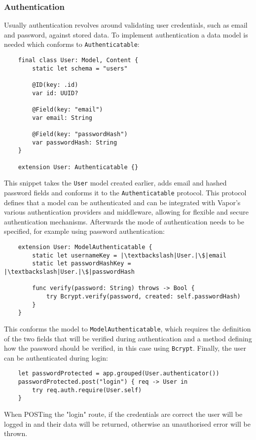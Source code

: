 \subsubsection{Authentication}
Usually authentication revolves around validating user credentials, such as email and password, against stored data. To implement authentication a data model is needed which conforms to \lstinline{Authenticatable}:
\begin{verbatim}
    final class User: Model, Content {
        static let schema = "users"
    
        @ID(key: .id)
        var id: UUID?
    
        @Field(key: "email")
        var email: String
    
        @Field(key: "passwordHash")
        var passwordHash: String
    }
    
    extension User: Authenticatable {}
\end{verbatim}
This snippet takes the \lstinline{User} model created earlier, adds email and hashed password fields and conforms it to the \lstinline{Authenticatable} protocol. This protocol defines that a model can be authenticated and can be integrated with Vapor's various authentication providers and middleware, allowing for flexible and secure authentication mechanisms.
Afterwards the mode of authentication needs to be specified, for example using password authentication:
\begin{verbatim}
    extension User: ModelAuthenticatable {
        static let usernameKey = |\textbackslash|User.|\$|email
        static let passwordHashKey = |\textbackslash|User.|\$|passwordHash
    
        func verify(password: String) throws -> Bool {
            try Bcrypt.verify(password, created: self.passwordHash)
        }
    }
\end{verbatim}
This conforms the model to \lstinline{ModelAuthenticatable}, which requires the definition of the two fields that will be verified during authentication and a method defining how the password should be verified, in this case using \lstinline{Bcrypt}.
Finally, the user can be authenticated during login:
\begin{verbatim}
    let passwordProtected = app.grouped(User.authenticator())
    passwordProtected.post("login") { req -> User in
        try req.auth.require(User.self)
    }
\end{verbatim}
When POSTing the "login" route, if the credentials are correct the user will be logged in and their data will be returned, otherwise an unauthorised error will be thrown. \cite{vapor-docs}

